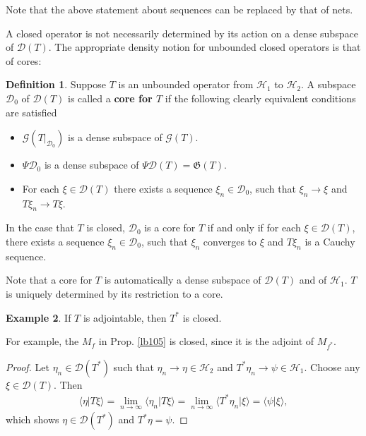 \documentclass[12pt,b5paper,notitlepage]{article}
\theoremstyle{definition}
\newtheorem{df}{Definition}[section]
\newtheorem{eg}[df]{Example}
\theoremstyle{plain}
\newcommand{\fk}{\mathfrak}
\newcommand{\mc}{\mathcal}
\newcommand{\Dom}{\scr D}
\newcommand{\bk}[1]{\langle {#1}\rangle}
\newcommand{\scr}{\mathscr}
\numberwithin{equation}{section}
\begin{document}
Note that the above statement about sequences can be replaced by that of nets.


A closed operator is not necessarily determined by its action on a dense subspace of $\Dom(T)$. The appropriate density notion for unbounded closed operators is that of cores:

\begin{df}
Suppose $T$ is an unbounded operator from $\mc H_1$ to $\mc H_2$. A  subspace $\Dom_0$ of $\Dom(T)$ is called a \textbf{core for $T$} if the following clearly equivalent conditions are satisfied
\begin{itemize}
		\item $\scr G(T|_{\Dom_0})$ is a dense subspace of $\scr G(T)$.
		\item $\Psi\Dom_0$ is a dense subspace of $\Psi\Dom(T)=\fk G(T)$.
		\item For each $\xi\in\Dom(T)$ there exists a sequence $\xi_n\in\Dom_0$, such that $\xi_n\rightarrow\xi$ and $T\xi_n\rightarrow T\xi$.
\end{itemize} 
In the case that $T$ is closed, $\Dom_0$ is a core for $T$ if and only if for each $\xi\in\Dom(T)$, there exists a sequence $\xi_n\in\Dom_0$, such that $\xi_n$ converges to $\xi$ and $T\xi_n$ is a Cauchy sequence.
\end{df}

Note that a core for $T$ is automatically a dense subspace of $\Dom(T)$ and of $\mc H_1$. $T$ is uniquely determined by its restriction to a core.










\begin{eg}\label{lb23}
If $T$ is adjointable, then $T^*$ is closed.
\end{eg}


For example, the $M_f$  in Prop. \ref{lb105} is closed, since it is the adjoint of $M_{f^*}$. 

\begin{proof}
Let $\eta_n\in\Dom(T^*)$ such that $\eta_n\rightarrow\eta\in\mc H_2$ and $T^*\eta_n\rightarrow\psi\in\mc H_1$. Choose any $\xi\in\Dom(T)$. Then
\begin{align*}
\bk{\eta|T\xi}=\lim_{n\rightarrow\infty}\bk{\eta_n|T\xi}=\lim_{n\rightarrow\infty}\bk{T^*\eta_n|\xi}=\bk{\psi|\xi},
\end{align*}
which shows $\eta\in\Dom(T^*)$ and $T^*\eta=\psi$.
\end{proof}
\end{document}
